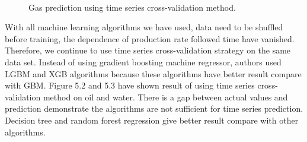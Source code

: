 \documentclass[12pt,a4paper]{report}
\begin{document}
\begin{figure}[H]
     \begin{center}
%
        \\ %
    \end{center}
    \caption{%
        Gas prediction using time series cross-validation method.
     }%
   \label{fig:subfigures}
\end{figure}
With all machine learning algorithms we have used, data need to be shuffled before training, the dependence of production rate followed time have vanished. Therefore, we continue to use time series cross-validation strategy on the same data set. Instead of using gradient boosting machine regressor, authors used LGBM and XGB algorithms because these algorithms have better result compare with GBM. Figure 5.2 and 5.3 have shown result of using time series cross-validation method on oil and water. There is a gap between actual values and prediction demonstrate the algorithms are not sufficient for time series prediction. Decision tree and random forest regression give better result compare with other algorithms.
\end{document}
